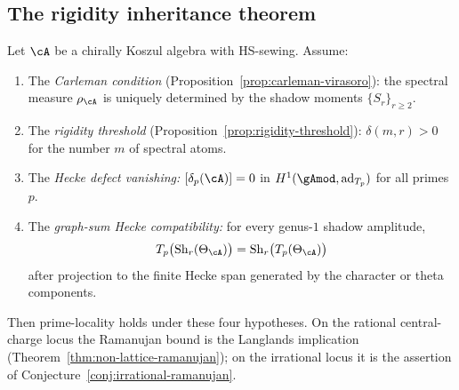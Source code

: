 \subsection{The rigidity inheritance theorem}%
\label{subsec:rigidity-inheritance}%

\begin{theorem}%
\label{thm:rigidity-inheritance}%
%
%
Let $\cA$ be a chirally Koszul algebra with HS-sewing.
Assume:
\begin{enumerate}[label=\textup{(\alph*)}]
\item The \emph{Carleman condition}
 \textup{(}Proposition~\textup{\ref{prop:carleman-virasoro}}\textup{):}
 the spectral measure $\rho_\cA$ is uniquely determined by
 the shadow moments $\{S_r\}_{r \ge 2}$.
\item The \emph{rigidity threshold}
 \textup{(}Proposition~\textup{\ref{prop:rigidity-threshold}}\textup{):}
 $\delta(m,r) > 0$ for the number $m$ of spectral atoms.
\item The \emph{Hecke defect vanishing:}
 $[\delta_p(\cA)] = 0$ in $H^1(\gAmod,
 \mathrm{ad}_{T_p})$ for all primes~$p$.
\item The \emph{graph-sum Hecke compatibility:}
 for every genus-$1$ shadow amplitude,
 \[
  T_p\bigl(\operatorname{Sh}_r(\Theta_\cA)\bigr)
  =
  \operatorname{Sh}_r\bigl(T_p(\Theta_\cA)\bigr)
 \]
 after projection to the finite Hecke span generated by the
 character or theta components.
\end{enumerate}
Then prime-locality holds under these four hypotheses. On the rational
central-charge locus the Ramanujan bound is the Langlands implication
\textup{(}Theorem~\textup{\ref{thm:non-lattice-ramanujan}}\textup{)};
on the irrational locus it is the assertion of
Conjecture~\textup{\ref{conj:irrational-ramanujan}}.
\end{theorem}

